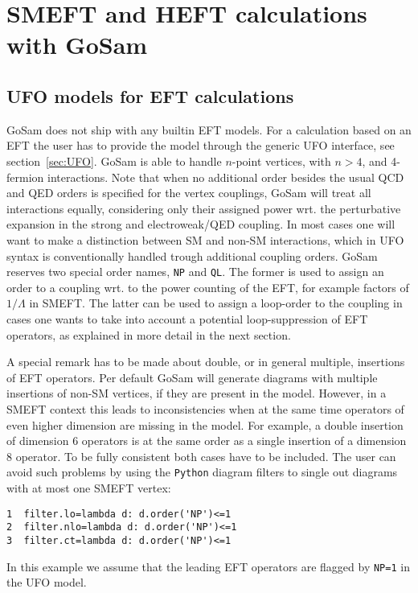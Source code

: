 \documentclass[11pt,a4paper]{refrep}
\newcommand{\gosam}{{\sc GoSam}\xspace}
\newcommand{\python}{{\tt Python}\xspace}
\begin{document}


\chapter{SMEFT and HEFT calculations with \gosam}
\label{sec:EFT}

\section{UFO models for EFT calculations}
\gosam does not ship with any builtin EFT models. For a calculation based on an EFT the user has to provide the model through the generic UFO interface, see section~\ref{sec:UFO}. \gosam is able to handle $n$-point vertices, with $n>4$, and 4-fermion interactions. Note that when no additional order besides the usual QCD and QED orders is specified for the vertex couplings, \gosam will treat all interactions equally, considering only their assigned power wrt. the perturbative expansion in the strong and electroweak/QED coupling. In most cases one will want to make a distinction between SM and non-SM interactions, which in UFO syntax is conventionally handled trough additional coupling orders. \gosam reserves two special order names, \texttt{NP} and \texttt{QL}. The former is used to assign an order to a coupling wrt. to the power counting of the EFT, for example factors of $1/\Lambda$ in SMEFT. The latter can be used to assign a loop-order to the coupling in cases one wants to take into account a potential loop-suppression of EFT operators, as explained in more detail in the next section.

A special remark has to be made about double, or in general multiple, insertions of EFT operators. Per default \gosam will generate diagrams with multiple insertions of non-SM vertices, if they are present in the model. However, in a SMEFT context this leads to inconsistencies when at the same time operators of even higher dimension are missing in the model. For example, a double insertion of dimension 6 operators is at the same order as a single insertion of a dimension 8 operator. To be fully consistent both cases have to be included. The user can avoid such problems by using the \python diagram filters to single out diagrams with at most one SMEFT vertex:
\begin{lstlisting}[gobble=3,%
     basicstyle=\ttfamily]
1  filter.lo=lambda d: d.order('NP')<=1
2  filter.nlo=lambda d: d.order('NP')<=1
3  filter.ct=lambda d: d.order('NP')<=1
\end{lstlisting}
In this example we assume that the leading EFT operators are flagged by \texttt{NP=1} in the UFO model.
\end{document}
